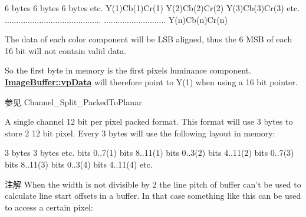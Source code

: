 \begin{Desc}
\begin{description}
\begin{DoxyCode}
6 bytes        6 bytes        6 bytes      etc.
Y(1)Cb(1)Cr(1) Y(2)Cb(2)Cr(2) Y(3)Cb(3)Cr(3) etc.
..........................................
...........................   Y(n)Cb(n)Cr(n)
\end{DoxyCode}


The data of each color component will be L\+S\+B aligned, thus the 6 M\+S\+B of each 16 bit will not contain valid data.

So the first byte in memory is the first pixels luminance component. {\bfseries \hyperlink{struct_image_buffer_ab67c9c21d749e786302c848b508e0673}{Image\+Buffer\+::vp\+Data}} will therefore point to Y(1) when using a 16 bit pointer.

\begin{DoxySeeAlso}{参见}
Channel\+\_\+\+Split\+\_\+\+Packed\+To\+Planar 
\end{DoxySeeAlso}
\item[{\em 
\hypertarget{group___common_interface_gga02e0fc32ff10e0bc0f2e8b9c321d65c9affbab617aecdd8053560ad6fcc3bc83d}{idpf\+Mono12\+Packed\+\_\+\+V1}\label{group___common_interface_gga02e0fc32ff10e0bc0f2e8b9c321d65c9affbab617aecdd8053560ad6fcc3bc83d}
}]A single channel 12 bit per pixel packed format. This format will use 3 bytes to store 2 12 bit pixel. Every 3 bytes will use the following layout in memory\+:


\begin{DoxyCode}
3 bytes                                               3 bytes                                              
       etc.
bits 0..7(1) bits 8..11(1) bits 0..3(2) bits 4..11(2) bits 0..7(3) bits 8..11(3) bits 0..3(4) bits 4..11(4)
       etc.
\end{DoxyCode}


\begin{DoxyNote}{注解}
When the width is not divisible by 2 the line pitch of buffer can't be used to calculate line start offsets in a buffer. In that case something like this can be used to access a certain pixel\+:
\end{DoxyNote}


\end{description}
\end{Desc}
